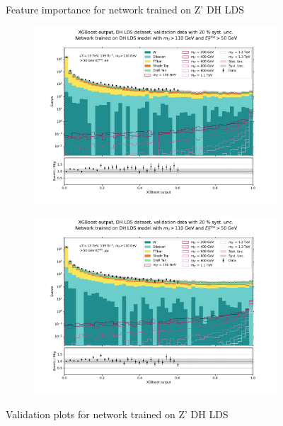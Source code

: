 \documentclass[12pt, a4paper]{book}
\begin{document}
\begin{figure}[!ht]
\begin{subfigure}[b]{0.7\textwidth}
      \end{subfigure}
   \caption{Feature importance for network trained on Z' DH LDS}\label{fig:DH_LDS_feat}
\end{figure}
\begin{figure}[!ht]
	\centering
	\begin{subfigure}[b]{0.49\textwidth}
      \centering
      \includegraphics[width=1\textwidth]{XGBoost/DH_LDS/VAL_ee.pdf}
      \end{subfigure}
   \hfill
   \begin{subfigure}[b]{0.49\textwidth}
      \centering
      \includegraphics[width=1\textwidth]{XGBoost/DH_LDS/VAL_uu.pdf}
      \end{subfigure}
   \caption{Validation plots for network trained on Z' DH LDS}\label{fig:DH_LDS_vals}
\end{figure}
\end{document}
